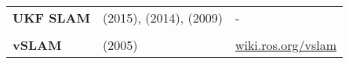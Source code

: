 \documentclass[a4paper,12pt]{scrartcl}
\begin{document}
{\begin{longtable}{l|l|l}
    \textbf{UKF SLAM}      & \cite{Wu2015} (2015), \cite{Wang2013} (2014), \cite{Huang2009} (2009)                       & -                                                                     \\
                           &                                                                                             &                                                                       \\ [-3mm]
    \textbf{vSLAM}         & \cite{Karlsson2005} (2005)                                                                  & {\url{wiki.ros.org/vslam}}                                            \\
\end{longtable}
}

\newpage
\printbibliography
\end{document}
